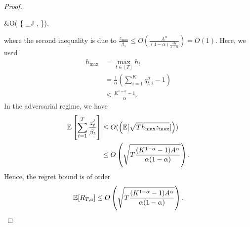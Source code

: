 \begin{proof}
\begin{nalign}
    &\leq O\left( \min\left\{ \inf_{J \in \sN}\E\left[\left\{ \sqrt{8J\sum_{t=1}^T h_t z_t} + \sqrt{2^{-J}Th_{\max}{z_{\max}}} \right\}\right], \E{} \right\}\right),
    \label{eq:boundzprimetbetatSB}
\end{nalign}
where the second inequality is due to $\frac{z_{\max}}{\beta_1} \leq O\left(\frac{A^\alpha}{(1-\alpha)\frac{4K}{1-\alpha}}\right) = O(1)$. Here, we used
\begin{align*}
    h_{\max} &= \max_{t \in [T]}h_t \\
    &= \frac{1}{\alpha}(\sum_{i=1}^K q_{t,i}^{\alpha} - 1) \\
    &\leq \frac{K^{1-\alpha} - 1}{\alpha}.
\end{align*}
In the adversarial regime, we have 
\begin{align*}
    \mathbb{E}\left[\sum_{t=1}^T \frac{z'_t}{\beta_t} \right] &\leq O(\left(\mathbb{E}[\sqrt{T h_{\max} z_{\max}}]\right)) \\
    &\leq O\left(\sqrt{T\frac{(K^{1-\alpha} - 1)A^\alpha}{\alpha(1-\alpha)}}\right).
\end{align*}
Hence, the regret bound is of order 
\begin{align*}
    \mathbb{E}[R_{T,a}] \leq O\left(\sqrt{T\frac{(K^{1-\alpha} - 1)A^\alpha}{\alpha(1-\alpha)}}\right).
\end{align*}
\end{proof}

